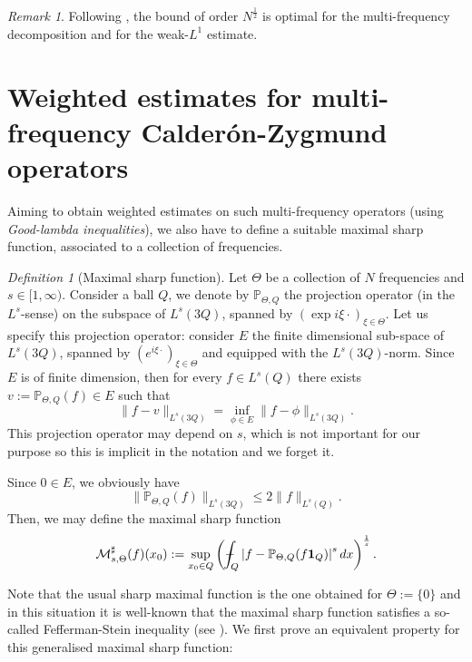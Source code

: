 \documentclass[11pt]{amsart}
\theoremstyle{remark}
\newtheorem{dfn}{Definition}[section]
\newtheorem{remark}{Remark}[section]
\newcommand{\mb}{\medskip\noindent}
\newcommand{\M}{{\mathcal M}}
\newcommand{\pr}{{\mathbb P}}
\def\Xint#1{\mathchoice
   {\XXint\displaystyle\textstyle{#1}}%
   {\XXint\textstyle\scriptstyle{#1}}%
   {\XXint\scriptstyle\scriptscriptstyle{#1}}%
   {\XXint\scriptscriptstyle\scriptscriptstyle{#1}}%
   \!\int}
\def\XXint#1#2#3{{\setbox0=\hbox{$#1{#2#3}{\int}$}
     \vcenter{\hbox{$#2#3$}}\kern-.5\wd0}}
\def\aver#1{\Xint-_{#1}}
\begin{document}
\begin{remark}
 Following \cite{NOT}, the bound of order $N^{\frac{1}{2}}$ is optimal for the multi-frequency decomposition and for the weak-$L^1$ estimate.
\end{remark}



\section{Weighted estimates for multi-frequency Calder\'on-Zygmund operators} \label{sec2}

Aiming to obtain weighted estimates on such multi-frequency operators (using {\it Good-lambda inequalities}), we also have to define a suitable maximal sharp function, associated to a collection of frequencies.

\begin{dfn}[Maximal sharp function] \label{def:max} Let $\Theta$ be a collection of $N$ frequencies and $s\in[1,\infty)$. Consider a ball $Q$, we denote by $\pr_{\Theta,Q}$ the projection operator (in the $L^s$-sense) on the subspace of $L^s(3Q)$, spanned by $(\exp {i\xi\cdot})_{\xi\in \Theta}$. Let us specify this projection operator: consider $E$ the finite dimensional sub-space of $L^s(3Q)$, spanned by $(e^{i\xi\cdot})_{\xi\in \Theta}$ and equipped with the $L^s(3Q)$-norm.
Since $E$ is of finite dimension, then for every $f\in L^s(Q)$ there exists $v:=\pr_{\Theta,Q}(f)\in E$ such that
$$ \|f-v\|_{L^s(3Q)} = \inf_{\phi\in E} \|f-\phi\|_{L^s(3Q)}.$$
This projection operator may depend on $s$, which is not important for our purpose so this is implicit in the notation and we forget it.

\mb
Since $0\in E$, we obviously have 
\begin{equation} \label{eq:projection}\|\pr_{\Theta,Q}(f)\|_{L^s(3Q)} \leq 2\|f\|_{L^s(Q)}. \end{equation} Then, we may define the maximal sharp function 
$$ \M_{s,\Theta}^\sharp (f)(x_0) := \sup_{x_0\in Q} \left(\aver{Q} \left|f-\pr_{\Theta,Q}(f{\bf 1}_Q) \right|^s  dx \right)^{\frac{1}{s}}.$$
\end{dfn}

Note that the usual sharp maximal function is the one obtained for $\Theta:=\{0\}$ and in this situation it is well-known that the maximal sharp function satisfies a so-called Fefferman-Stein inequality (see \cite{FS}). We first prove an equivalent property for this generalised maximal sharp function:
\end{document}

